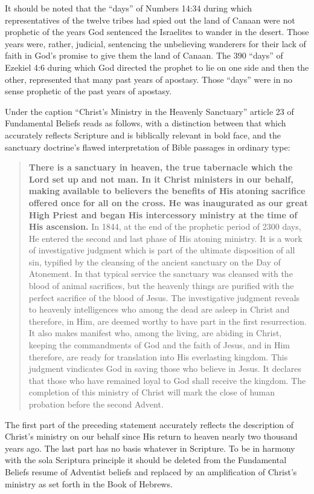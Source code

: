 It should be noted that the ``days'' of Numbers 14:34 during which
representatives of the twelve tribes had spied out the land of Canaan were
not prophetic of the years God sentenced the Israelites to wander in the
desert. Those years were, rather, judicial, sentencing the unbelieving
wanderers for their lack of faith in God's promise to give them the land of
Canaan. The 390 ``days'' of Ezekiel 4:6 during which God directed the prophet
to lie on one side and then the other, represented that many past years of
apostasy. Those ``days'' were in no sense prophetic of the past years of
apostasy.

Under the caption ``Christ's Ministry in the Heavenly Sanctuary'' article 23
of Fundamental Beliefs reads as follows, with a distinction between that
which accurately reflects Scripture and is biblically relevant in bold face,
and the sanctuary doctrine's flawed interpretation of Bible passages in
ordinary type:

\begin{quote}
\textbf{There is a sanctuary in heaven, the true tabernacle which
the Lord set up and not man. In it Christ ministers in our behalf,
making
available to believers the benefits of His atoning sacrifice offered once
for all on the cross. He was inaugurated as our great High Priest and
began
His intercessory ministry at the time of His ascension.} In 1844, at the
end
of the prophetic period of 2300 days, He entered the second and last phase
of His atoning ministry. It is a work of investigative judgment which is
part of the ultimate disposition of all sin, typified by the cleansing of
the ancient sanctuary on the Day of Atonement. In that typical service the
sanctuary was cleansed with the blood of animal sacrifices, but the heavenly
things are purified with the perfect sacrifice of the blood of Jesus. The
investigative judgment reveals to heavenly intelligences who among the dead
are asleep in Christ and therefore, in Him, are deemed worthy to have part
in the first resurrection. It also makes manifest who, among the living, are
abiding in Christ, keeping the commandments of God and the faith of Jesus,
and in Him therefore, are ready for translation into His everlasting
kingdom. This judgment vindicates God in saving those who believe in Jesus.
It declares that those who have remained loyal to God shall receive the 
kingdom. The completion of this ministry of Christ will mark the close of
human probation before the second Advent.
\end{quote}

The first part of the preceding statement accurately reflects the
description of Christ's ministry on our behalf since His return to heaven
nearly two thousand years ago. The last part has no basis whatever in
Scripture. To be in harmony with the sola Scriptura principle it should be
deleted from the Fundamental Beliefs resume of Adventist beliefs and
replaced by an amplification of Christ's ministry as set forth in the Book
of Hebrews.

